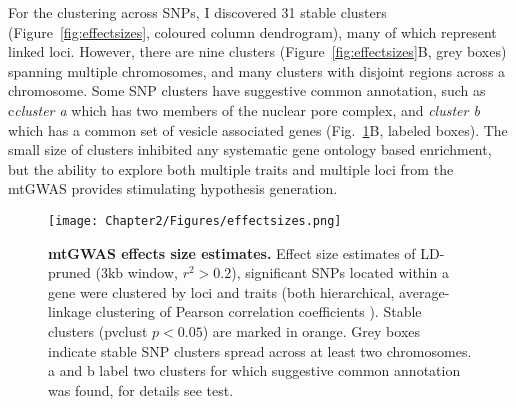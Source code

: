For the clustering across SNPs, I discovered 31 stable clusters (Figure~\ref{fig:effectsizes}, coloured column dendrogram), many of which represent linked loci. However, there are nine clusters (Figure~\ref{fig:effectsizes}B, grey boxes) spanning multiple chromosomes, and many clusters with disjoint regions across a chromosome. Some SNP clusters have suggestive common annotation, such as c\textit{cluster a} which has two members of the nuclear pore complex, and \textit{cluster b} which has a common set of vesicle associated genes (Fig.~\ref{fig:GWAS-yeast}B, labeled boxes). The small size of clusters inhibited any systematic gene ontology based enrichment, but the ability to explore both multiple traits and multiple loci from the mtGWAS provides stimulating hypothesis generation. 

\begin{figure}[hbtp]
	\centering
	\texttt{[image: Chapter2/Figures/effectsizes.png]}
	\caption{\textbf{mtGWAS effects size estimates.} Effect size estimates of LD-pruned (3kb window, \(r^2 > 0.2\)), significant SNPs located within a gene were clustered by loci and traits (both hierarchical, average-linkage clustering of Pearson correlation coefficients ). Stable clusters (pvclust \( p < 0.05\)) are marked in orange. Grey boxes indicate stable SNP clusters spread across at least two chromosomes. a and b label two clusters for which suggestive common annotation was found, for details see test.}
 	\label{fig:GWAS-yeast}
\end{figure}

